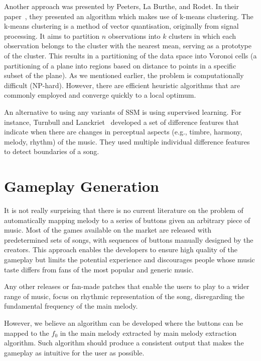Another approach was presented by Peeters, La Burthe, and Rodet. In their paper~\cite{Peeters}, they presented an algorithm which makes use of k-means clustering. The k-means clustering is a method of vector quantisation, originally from signal processing. It aims to partition $n$ observations into $k$ clusters in which each observation belongs to the cluster with the nearest mean, serving as a prototype of the cluster. This results in a partitioning of the data space into Voronoi cells (a partitioning of a plane into regions based on distance to points in a specific subset of the plane).
As we mentioned earlier, the problem is computationally difficult (NP-hard). However, there are efficient heuristic algorithms that are commonly employed and converge quickly to a local optimum.

An alternative to using any variants of SSM is using supervised learning. For instance, Turnbull and Lanckriet~\cite{segmentsupervised} developed a set of difference features that indicate when there are changes in perceptual aspects (e.g., timbre, harmony, melody, rhythm) of the music. They used multiple individual difference features to detect boundaries of a song. 

\vspace{10pt}

\section{Gameplay Generation}

It is not really surprising that there is no current literature on the problem of automatically mapping melody to a series of buttons given an arbitrary piece of music. Most of the games available on the market are released with predetermined sets of songs, with sequences of buttons manually designed by the creators. This approach enables the developers to ensure high quality of the gameplay but limits the potential experience and discourages people whose music taste differs from fans of the most popular and generic music. 

Any other releases or fan-made patches that enable the users to play to a wider range of music, focus on rhythmic representation of the song, disregarding the fundamental frequency of the main melody.

However, we believe an algorithm can be developed where the buttons can be mapped to the $f_{0}$ in the main melody extracted by main melody extraction algorithm. Such algorithm should produce a consistent output that makes the gameplay as intuitive for the user as possible.